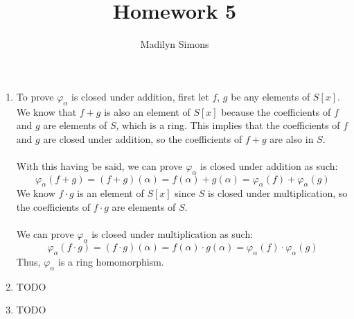 \documentclass{article}
\title{Homework 5}
\author{Madilyn Simons}
\date{}
\begin{document}
\maketitle

\begin{enumerate}

\item To prove $\varphi_{\alpha}$ is closed under addition, first let $f$, $g$
be any elements of $S[x]$.  We know that $f+g$ is also an element of
$S[x]$ because the coefficients of $f$ and $g$ are elements of $S$, which is a
ring.  This implies that the coefficients of $f$ and $g$ are closed under
addition, so the coefficients of $f+g$ are also in $S$.
\\ \\
With this having be said, we can prove $\varphi_{\alpha}$ is closed under addition
as such:
\[
\varphi_{\alpha}(f+g) = (f+g)(\alpha) = f(\alpha) + g(\alpha)
= \varphi_{\alpha}(f) + \varphi_{\alpha}(g)
\]
We know $f \cdot g$ is an element of $S[x]$ since $S$ is closed under multiplication,
so the coefficients of $f \cdot g$ are elements of $S$.
\\ \\
We can prove $\varphi_{\alpha}$ is closed under multiplication as such:
\[
\varphi_{\alpha}(f \cdot g) = (f \cdot g)(\alpha) = f(\alpha) \cdot g(\alpha)
= \varphi_{\alpha}(f) \cdot \varphi_{\alpha}(g)
\]
Thus, $\varphi_{\alpha}$ is a ring homomorphism.

\item TODO
\item TODO

\end{enumerate}
\end{document}
